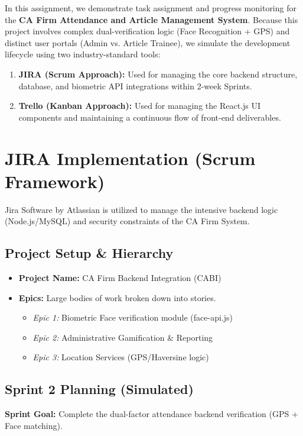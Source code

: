 \documentclass[12pt,a4paper]{article}
\begin{document}
In this assignment, we demonstrate task assignment and progress monitoring for the \textbf{CA Firm Attendance and Article Management System}. Because this project involves complex dual-verification logic (Face Recognition + GPS) and distinct user portals (Admin vs. Article Trainee), we simulate the development lifecycle using two industry-standard tools:
\begin{enumerate}
    \item \textbf{JIRA (Scrum Approach):} Used for managing the core backend structure, database, and biometric API integrations within 2-week Sprints.
    \item \textbf{Trello (Kanban Approach):} Used for managing the React.js UI components and maintaining a continuous flow of front-end deliverables.
\end{enumerate}

\section{JIRA Implementation (Scrum Framework)}
Jira Software by Atlassian is utilized to manage the intensive backend logic (Node.js/MySQL) and security constraints of the CA Firm System.

\subsection{Project Setup \& Hierarchy}
\begin{itemize}
    \item \textbf{Project Name:} CA Firm Backend Integration (CABI)
    \item \textbf{Epics:} Large bodies of work broken down into stories.
    \begin{itemize}
        \item \textit{Epic 1:} Biometric Face verification module (face-api.js)
        \item \textit{Epic 2:} Administrative Gamification \& Reporting
        \item \textit{Epic 3:} Location Services (GPS/Haversine logic)
    \end{itemize}
\end{itemize}

\subsection{Sprint 2 Planning (Simulated)}
\textbf{Sprint Goal:} Complete the dual-factor attendance backend verification (GPS + Face matching).
\end{document}
